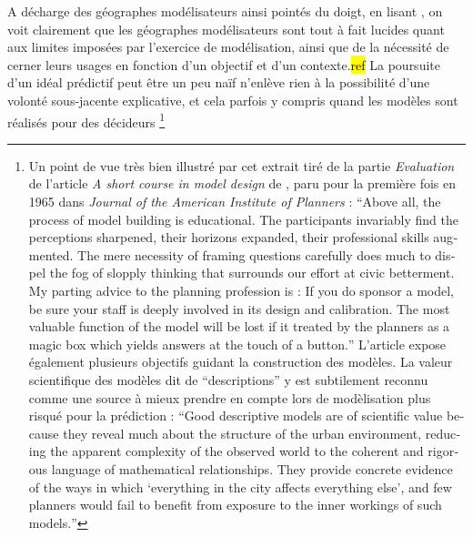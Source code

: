 A décharge des géographes modélisateurs ainsi pointés du doigt, en lisant \autocites{Chorley1967, Harvey1969, Hagget1965}, on voit clairement que les géographes modélisateurs sont tout à fait lucides quant aux limites imposées par l'exercice de modélisation, ainsi que de la nécessité de cerner leurs usages en fonction d'un objectif et d'un contexte.\hl{ref} La poursuite d'un idéal prédictif peut être un peu naïf n'enlève rien à la possibilité d'une volonté sous-jacente explicative, et cela parfois y compris quand les modèles sont réalisés pour des décideurs \footnote{ Un point de vue très bien illustré par cet extrait tiré de la partie \textit{Evaluation} de l'article \textit{A short course in model design} de \textcite[62]{Lowry1968}, paru pour la première fois en 1965 dans \textit{Journal of the American Institute of Planners} : \foreignquote{english}{Above all, the process of model building is educational. The participants invariably find the perceptions sharpened, their horizons expanded, their professional skills augmented. The mere necessity of framing questions carefully does much to dispel the fog of slopply thinking that surrounds our effort at civic betterment. My parting advice to the planning profession is : If you do sponsor a model, be sure your staff is deeply involved in its design and calibration. The most valuable function of the model will be lost if it treated by the planners as a magic box which yields answers at the touch of a button.} L'article expose également plusieurs objectifs guidant la construction des modèles. La valeur scientifique des modèles dit de \enquote{descriptions} y est subtilement reconnu comme une source à mieux prendre en compte lors de modèlisation plus risqué pour la prédiction : \foreignquote{english}{Good descriptive models are of scientific value because they reveal much about the structure of the urban environment, reducing the apparent complexity of the observed world to the coherent and rigorous language of mathematical relationships. They provide concrete evidence of the ways in which \enquote{everything in the city affects everything else}, and few planners would fail to benefit from exposure to the inner workings of such models.} }

